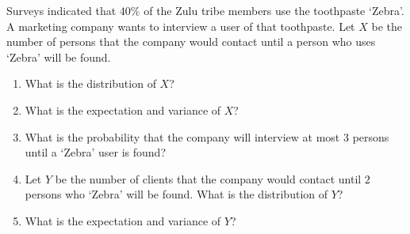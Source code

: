\documentclass[fleqn, a4paper, 11pt, oneside]{amsart}
\theoremstyle{definition}
\theoremstyle{theorem}
\begin{document}
\begin{question}
	Surveys indicated that $40\%$ of the Zulu tribe members use the toothpaste `Zebra'.
	A marketing company wants to interview a user of that toothpaste.
	Let $X$ be the number of persons that the company would contact until a person who uses `Zebra' will be found.
	\begin{enumerate}
		\item
			What is the distribution of $X$?
		\item
			What is the expectation and variance of $X$?
		\item
			What is the probability that the company will interview at most $3$ persons until a `Zebra' user is found?
		\item
			Let $Y$ be the number of clients that the company would contact until $2$ persons who `Zebra' will be found.
			What is the distribution of $Y$?
		\item
			What is the expectation and variance of $Y$?
	\end{enumerate}
\end{question}
\end{document}

